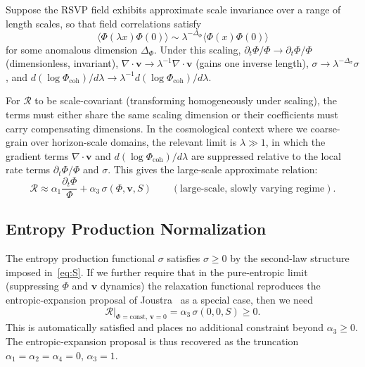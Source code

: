 \documentclass[12pt,a4paper]{article}
\theoremstyle{remark}
\newcommand{\vv}{\mathbf{v}}
\newcommand{\Rcal}{\mathcal{R}}
\begin{document}
Suppose the RSVP field exhibits approximate scale invariance over a range of
length scales, so that field correlations satisfy
\begin{equation}
\langle \Phi(\lambda x) \Phi(0) \rangle \sim \lambda^{-\Delta_\Phi}
\langle \Phi(x)\Phi(0) \rangle
\end{equation}
for some anomalous dimension $\Delta_\Phi$. Under this scaling,
$\partial_t\Phi/\Phi \to \partial_t\Phi/\Phi$ (dimensionless, invariant),
$\nabla\cdot\vv \to \lambda^{-1}\nabla\cdot\vv$ (gains one inverse length),
$\sigma \to \lambda^{-\Delta_\sigma}\sigma$, and $d(\log\Phi_{\mathrm{coh}})/d\lambda
\to \lambda^{-1}d(\log\Phi_{\mathrm{coh}})/d\lambda$.

For $\Rcal$ to be scale-covariant (transforming homogeneously under scaling),
the terms must either share the same scaling dimension or their coefficients
must carry compensating dimensions. In the cosmological context where we
coarse-grain over horizon-scale domains, the relevant limit is $\lambda \gg 1$,
in which the gradient terms $\nabla\cdot\vv$ and $d(\log\Phi_{\mathrm{coh}})/d\lambda$
are suppressed relative to the local rate terms $\partial_t\Phi/\Phi$ and $\sigma$.
This gives the large-scale approximate relation:
\begin{equation}
\Rcal \approx \alpha_1 \frac{\partial_t\Phi}{\Phi} + \alpha_3\,\sigma(\Phi,\vv,S)
\qquad (\text{large-scale, slowly varying regime}).
\label{eq:R_largescale}
\end{equation}

\subsection{Entropy Production Normalization}

The entropy production functional $\sigma$ satisfies $\sigma \ge 0$ by the
second-law structure imposed in~\eqref{eq:S}. If we further require that in
the pure-entropic limit (suppressing $\Phi$ and $\vv$ dynamics) the relaxation
functional reproduces the entropic-expansion proposal of Joustra~\cite{joustra}
as a special case, then we need
\begin{equation}
\Rcal\big|_{\Phi=\mathrm{const},\,\vv=0} = \alpha_3\,\sigma(0,0,S) \ge 0.
\end{equation}
This is automatically satisfied and places no additional constraint beyond
$\alpha_3 \ge 0$. The entropic-expansion proposal is thus recovered as the
truncation $\alpha_1 = \alpha_2 = \alpha_4 = 0$, $\alpha_3 = 1$.
\end{document}
